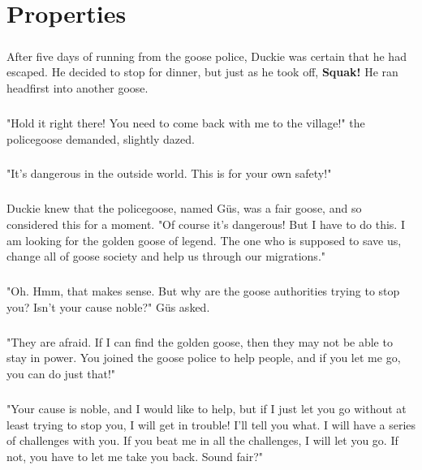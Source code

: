 \chapter{Properties}
\paragraph{} After five days of running from the goose police, Duckie was certain that he had escaped. He decided to stop for dinner, but just as he took off, \textbf{Squak!} He ran headfirst into another goose. 
\paragraph{} "Hold it right there! You need to come back with me to the village!" the policegoose demanded, slightly dazed. 
\paragraph{} "It's dangerous in the outside world. This is for your own safety!"
\paragraph{} Duckie knew that the policegoose, named Güs, was a fair goose, and so considered this for a moment. "Of course it's dangerous! But I have to do this. I am looking for the golden goose of legend. The one who is supposed to save us, change all of goose society and help us through our migrations."
\paragraph{} "Oh. Hmm, that makes sense. But why are the goose authorities trying to stop you? Isn't your cause noble?" Güs asked.
\paragraph{} "They are afraid. If I can find the golden goose, then they may not be able to stay in power. You joined the goose police to help people, and if you let me go, you can do just that!"
\paragraph{} "Your cause is noble, and I would like to help, but if I just let you go without at least trying to stop you, I will get in trouble! I'll tell you what. I will have a series of challenges with you. If you beat me in all the challenges, I will let you go. If not, you have to let me take you back. Sound fair?"
